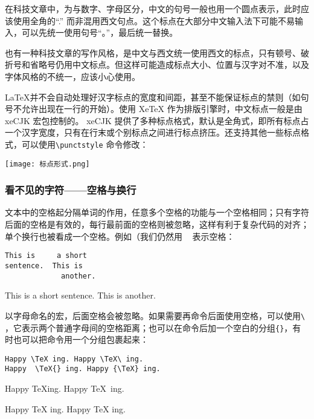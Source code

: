 在科技文章中，为与数字、字母区分，中文的句号一般也用一个圆点表示，此时应该使用全角的“.” 而非混用西文句点。这个标点在大部分中文输入法下可能不易输入，可以先统一使用句号“。”，最后统一替换。

也有一种科技文章的写作风格，是中文与西文统一使用西文的标点，只有顿号、破折号和省略号仍用中文标点。但这样可能造成标点大小、位置与汉字对不准，以及字体风格的不统一，应该小心使用。

\LaTeX 并不会自动处理好汉字标点的宽度和间距，甚至不能保证标点的禁则（如句号不允许出现在一行的开始）。使用 XeTeX 作为排版引擎时，中文标点一般是由 xeCJK 宏包控制的。 xeCJK 提供了多种标点格式，默认是全角式，即所有标点占一个汉字宽度，只有在行末或个别标点之间进行标点挤压。还支持其他一些标点格式，可以使用\verb|\punctstyle| 命令修改：

\begin{center}
    \texttt{[image: 标点形式.png]} \centering
\end{center}

\subsubsection{看不见的字符——空格与换行}\label{sec:space}

文本中的空格起分隔单词的作用，任意多个空格的功能与一个空格相同；只有字符后面的空格是有效的，每行最前面的空格则被忽略，这样有利于复杂代码的对齐；单个换行也被看成一个空格。例如（我们仍然用 \lstinline[showspaces=true]{ } 表示空格：

\begin{minipage}[t]{0.45\textwidth}
    \begin{lstlisting}[showspaces=true]
This is     a short
sentence.  This is
             another.
\end{lstlisting}
\end{minipage}
\hfill
\begin{minipage}[c]{0.45\textwidth}
This is     a short
sentence.  This is
             another.
\end{minipage}

以字母命名的宏，后面空格会被忽略。如果需要再命令后面使用空格，可以使用\lstinline[showspaces=true]{\ }，它表示两个普通字母间的空格距离；也可以在命令后加一个空白的分组\verb|{}|，有时也可以把命令用一个分组包裹起来：

\begin{minipage}[t]{0.45\textwidth}
\begin{lstlisting}[showspaces=true]
Happy \TeX ing. Happy \TeX\ ing.
Happy  \TeX{} ing. Happy {\TeX} ing.
\end{lstlisting}
\end{minipage}
\hfill
\begin{minipage}[t]{0.45\textwidth}
Happy \TeX ing. Happy \TeX\ ing.

Happy  \TeX{} ing. Happy {\TeX} ing.
\end{minipage}

